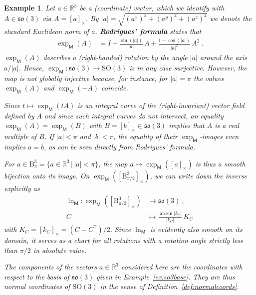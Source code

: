 \documentclass[10pt,a4paper]{article}
\theoremstyle{mytheorem}
\theoremstyle{mydefinition}
\newtheorem{example}[theorem]{Example}
\newcommand{\mydef}[1]{\textbf{\textit{#1}}}
\newcommand{\trans}{^\mathsf{T}}
\newcommand{\SO}{\mathrm{SO}}
\newcommand{\fso}{\mathfrak{so}}
\begin{document}
\begin{example}
Let $a\in\mathbb{R}^3$ be a (coordinate) vector, which we identify with $A\in\fso(3)$ via $A=[a]_\times$.
By $|a|=\sqrt{(a^x)^2+(a^y)^2+(a^z)^2}$ we denote the standard Euclidean norm of $a$.
\mydef{Rodrigues' formula} states that
\begin{align*}
	\exp_\mathsf{M}(A)
	&=
	I + \frac{\sin(|a|)}{|a|}\,A + \frac{1 - \cos(|a|)}{|a|^2}\,A^2
	\ .
\end{align*}
$\exp_\mathsf{M}(A)$ describes a (right-handed) rotation by the angle $|a|$ around the axis $a/|a|$.\footnotemark
Hence, $\exp_\mathsf{M}:\fso(3)\rightarrow \SO(3)$ is in any case surjective.
However, the map is not globally injective because, for instance, for $|a|=\pi$ the values $\exp_\mathsf{M}(A)$ and $\exp_\mathsf{M}(-A)$ coincide.

Since $t\mapsto\exp_\mathsf{M}(tA)$ is an integral curve of the (right-invariant) vector field defined by $A$ and since such integral curves do not intersect, an equality $\exp_\mathsf{M}(A)=\exp_\mathsf{M}(B)$ with $B=[b]_\times\in\fso(3)$ implies that $A$ is a real multiple of $B$.
If $|a|<\pi$ and $|b|<\pi$, the equality of their $\exp_\mathsf{M}$-images even implies $a=b$, as can be seen directly from Rodrigues' formula.

For $a\in\mathrm{B}^3_\pi=\{a\in\mathbb{R}^3\,|\,|a|<\pi\}$, the map $a\mapsto\exp_\mathsf{M}([a]_\times)$ is thus a smooth bijection onto its image.
On $\exp_\mathsf{M}([\mathrm{B}^3_{\pi/2}]_\times)$, we can write down the inverse explicitly as
\begin{align*}
	\ln_\mathsf{M}:
	\exp_\mathsf{M}([\mathrm{B}^3_{\pi/2}]_\times)
	&\rightarrow \fso(3)
	\ ,\nonumber\\
	C 
	&\mapsto
	\frac{\arcsin|k_C|}{|k_C|}
	\, K_C
\end{align*}
with $K_C=[k_C]_\times=(C-C\trans)/2$.
Since $\ln_\mathsf{M}$ is evidently also smooth on its domain, it serves as a chart for all rotations with a rotation angle strictly less than $\pi/2$ in absolute value.

The components of the vectors $a\in\mathbb{R}^3$ considered here are the coordinates with respect to the basis of $\fso(3)$ given in Example~\ref{ex:so3base}.
They are thus normal coordinates of $\SO(3)$ in the sense of Definition~\ref{def:normalcoords}.
\end{example}
\end{document}
